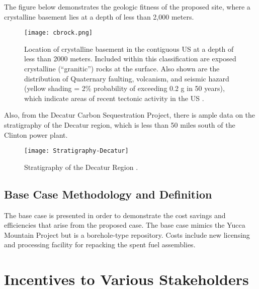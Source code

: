   The figure below demonstrates the geologic fitness of the proposed site, where 
  a crystalline basement lies at a depth of less than 2,000 meters.



\begin{figure}[!h] 
  \centering
  \texttt{[image: cbrock.png]}	
  \caption{Location of crystalline basement in the contiguous US at a depth of
less than 2000 meters.  Included within this classification are exposed
crystalline (“granitic”) rocks at the surface. Also shown are the distribution
of Quaternary faulting, volcanism, and seismic hazard (yellow shading = 2\%
probability of exceeding 0.2 g in 50 years), which indicate areas of recent
tectonic activity in the US \cite{Perry_2015}.}
  \label{fig:cbrock}
\end{figure}

  
  \iffalse
\begin{figure}[!h] 
  \centering
  \texttt{[image: Crystalline-Thickness]}	
  \caption{Depth of Crystalline Rock
  \cite{Perry_2015}.}
  \label{fig:Depth}
\end{figure}
 \fi
  
  
  Also, from the Decatur Carbon Sequestration Project, there is ample data
  on the stratigraphy of the Decatur region, which is less than 50 miles south
  of the Clinton power plant.
 
  
  
  
\begin{figure}[!h] 
  \centering
  \texttt{[image: Stratigraphy-Decatur]}	
  \caption{Stratigraphy of the Decatur Region
  \cite{McDonald_2012}.}
  \label{fig:Stratigraphy}
\end{figure}
  
\subsection{Base Case Methodology and Definition}
The base case is presented in order to demonstrate the cost savings and efficiencies 
that arise from the proposed case. The base case mimics the Yucca Mountain Project
but is a borehole-type repository. Costs include new licensing and processing facility
 for repacking the spent fuel assemblies.


\section {Incentives to Various Stakeholders}


